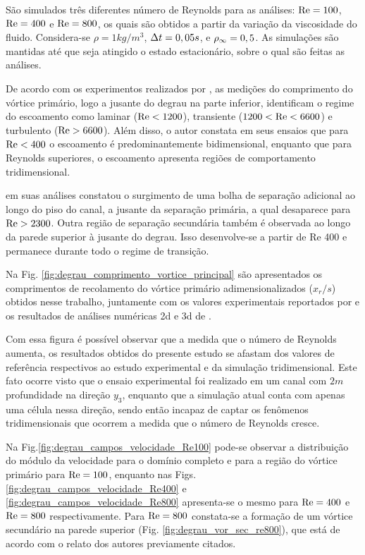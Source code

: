 \documentclass[tese_patricia]{subfiles}
\begin{document}
São simulados três diferentes número de Reynolds para as análises: $\mathrm{Re} = 100$, $\mathrm{Re} = 400$ e $\mathrm{Re} = 800$, os quais são obtidos a partir da variação da viscosidade do fluido. Considera-se  $\rho = 1kg/m^{3}$, $\Delta t = 0,05s$, e $\rho_\infty = 0,5$. As simulações são mantidas até que seja atingido o estado estacionário, sobre o qual são feitas as análises.

De acordo com os experimentos realizados por , as medições do comprimento do vórtice primário, logo a jusante do degrau na parte inferior, identificam o regime do escoamento como laminar ($\mathrm{Re} < 1200$), transiente ($1200 < \mathrm{Re} < 6600$) e turbulento ($\mathrm{Re} > 6600$). Além disso, o autor constata em seus ensaios que para $\mathrm{Re} < 400$ o escoamento é predominantemente bidimensional, enquanto que para Reynolds superiores,  o escoamento apresenta regiões de comportamento tridimensional. 

 em suas análises constatou o surgimento de uma bolha de separação adicional ao longo do piso do canal, a jusante da separação primária, a qual desaparece para $\mathrm{Re} > 2300$. Outra região de separação secundária também é observada ao longo da parede superior à jusante do degrau. Isso desenvolve-se a partir de Re 400 e permanece durante todo o regime de transição.

Na Fig. \ref{fig:degrau_comprimento_vortice_principal} são apresentados os comprimentos de recolamento do vórtice primário adimensionalizados ($x_{r}/s$) obtidos nesse trabalho, juntamente com os valores experimentais reportados por  e os resultados de análises numéricas 2d e 3d de . 

Com essa figura é possível observar que a medida que o número de Reynolds aumenta, os resultados obtidos do presente estudo se afastam dos valores de referência respectivos ao estudo experimental e da simulação tridimensional. Este fato ocorre visto que o ensaio experimental foi realizado em um canal com $2m$ profundidade na direção $y_3$, enquanto que a simulação atual conta com apenas uma célula nessa direção, sendo então incapaz de captar os fenômenos tridimensionais que ocorrem a medida que o número de Reynolds cresce. 

Na Fig.\ref {fig:degrau_campos_velocidade_Re100} pode-se observar a distribuição do módulo da velocidade para o domínio completo e para a região do vórtice primário para $\mathrm{Re} = 100$, enquanto nas Figs. \ref {fig:degrau_campos_velocidade_Re400} e \ref {fig:degrau_campos_velocidade_Re800} apresenta-se o mesmo para $\mathrm{Re} = 400$ e $\mathrm{Re} = 800$ respectivamente. Para $\mathrm{Re} = 800$ constata-se a formação de um vórtice secundário na parede superior (Fig. \ref{fig:degrau_vor_sec_re800}), que está de acordo com o relato dos autores previamente citados.
\end{document}
